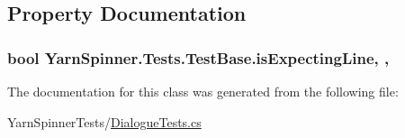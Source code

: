 \subsection{Property Documentation}
\hypertarget{a00146_a47f35b8e8123ed9471883d02b8bc9f3e}{
\subsubsection[{is\-Expecting\-Line}]{\setlength{\rightskip}{0pt plus 5cm}bool Yarn\-Spinner.\-Tests.\-Test\-Base.\-is\-Expecting\-Line\hspace{0.3cm}{\ttfamily [get]}, {\ttfamily [protected]}, {\ttfamily [inherited]}}}\label{a00146_a47f35b8e8123ed9471883d02b8bc9f3e}


The documentation for this class was generated from the following file\-:\begin{DoxyCompactItemize}
\item 
Yarn\-Spinner\-Tests/\hyperlink{a00278}{Dialogue\-Tests.\-cs}\end{DoxyCompactItemize}

